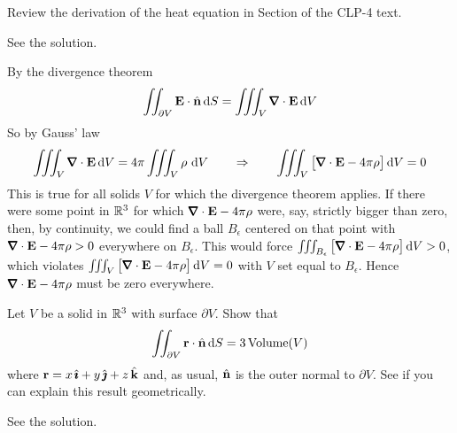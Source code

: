 \begin{hint} 
Review the derivation of the heat equation in Section 
of the CLP-4 text.
\end{hint}

\begin{answer} 
See the solution.
\end{answer}

\begin{solution} 
By the divergence theorem
\begin{equation*}
\dblInt_{\partial V}\vE\cdot\hn\, \dee{S}
=\tripInt_V\vnabla\cdot\vE\,\dee{V}
\end{equation*}
So by Gauss' law
\begin{equation*}
\tripInt_V\vnabla\cdot\vE\,\dee{V}=4\pi\tripInt_V\rho\ \dee{V}
\qquad\Rightarrow\qquad
\tripInt_V\big[\vnabla\cdot\vE-4\pi\rho\big]\,\dee{V}=0
\end{equation*}
This is true for all solids $V$ for which the divergence theorem applies.
If there were some point in $\mathbb{R}^3$ for which $\vnabla\cdot\vE-4\pi\rho$
were, say, strictly bigger than zero, then, by continuity, we could find a ball
$B_\epsilon$ centered on that point with $\vnabla\cdot\vE-4\pi\rho>0$ everywhere
on $B_\epsilon$. This would force  $\tripInt_{B_\epsilon}\big[\vnabla\cdot\vE-4\pi\rho\big]\,\dee{V}>0$,
which violates $\tripInt_V\big[\vnabla\cdot\vE-4\pi\rho\big]\,\dee{V}=0$ with $V$
set equal to $B_\epsilon$. Hence $\vnabla\cdot\vE-4\pi\rho$ must be zero everywhere.
\end{solution}

\begin{question}
Let $V$ be a solid in $\mathbb{R}^3$ with surface $\partial V$.
Show that
\begin{equation*}
\iint_{\partial V}\mathbf{r}\cdot\hat{\mathbf{n}}\,\mathrm{d}S=3\,\text{Volume}(V)
\end{equation*}
where $\mathbf{r}=x\,\hat{\pmb{\imath}}+y\,\hat{\pmb{\jmath}}+z\,\hat{\mathbf{k}}$ and, as usual, $\hat{\mathbf{n}}$ is the outer 
normal to $\partial V$.
See if you can explain this result geometrically. 
\end{question}

%

\begin{answer} 
See the solution.
\end{answer}

